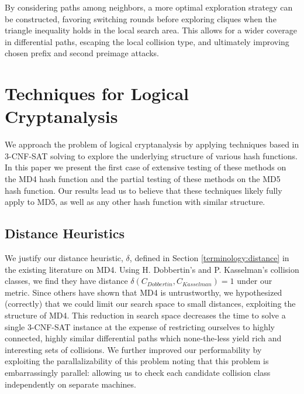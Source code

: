 \documentclass[conference]{IEEEtran}
\begin{document}
By considering paths among neighbors, a more optimal exploration strategy can
be constructed, favoring switching rounds before exploring cliques when the
triangle inequality holds in the local search area. This allows for a wider
coverage in differential paths, escaping the local collision type, and
ultimately improving chosen prefix and second preimage attacks.


\section{Techniques for Logical Cryptanalysis} \label{Sec:Logical}


We approach the problem of logical cryptanalysis by applying
techniques based in 3-CNF-SAT solving to explore the underlying
structure of various hash functions.  In this paper we present the
first case of extensive testing of these methods on the MD4 hash
function and the partial testing of these methods on the MD5 hash
function.  Our results lead us to believe that these techniques likely
fully apply to MD5, as well as any other hash function with similar structure.


\subsection{Distance Heuristics}

We justify our distance heuristic, $\delta$, defined in Section
\ref{terminology:distance} in the existing literature on MD4.  Using
H. Dobbertin's \cite{Dobbertin1998} and P. Kasselman's \cite{KasselmanMD4}
collision classes, we find they have distance $\delta(C_{Dobbertin}, C_{Kasselman}) = 1$
under our metric. Since others have shown that MD4 is untrustworthy,
we hypothesized (correctly) that we could
limit our search space to small distances, exploiting the structure of MD4. This
reduction in search space decreases the time to solve a single 3-CNF-SAT
instance at the expense of restricting ourselves to highly connected, highly
similar differential paths which none-the-less yield rich and
interesting sets of collisions. We further improved our performability
by exploiting the parallalizability of this problem
noting that this problem is embarrassingly parallel: allowing us to
check each
candidate collision class independently on separate machines.
\end{document}

